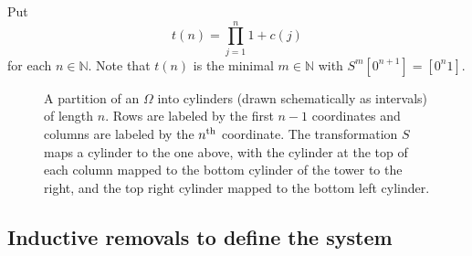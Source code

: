 \documentclass[10pt]{amsart}
\theoremstyle{definition}\newtheorem{defi}[theo]{Definition}\newtheorem{rema}[theo]{Remark}\newtheorem{exam}[theo]{Example}\newtheorem{exem}[theo]{Example}\newtheorem{nota}[theo]{Notation}
\newcommand{\N}{\mathbb{N}}
\begin{document}
Put
\[
t(n) = \prod_{j=1}^n 1 + c(j)
\]
for each $n \in \N$. Note that $t(n)$ is the minimal $m \in \N$ with $S^m[0^{n+1}]=[0^n 1]$.



\begin{figure}[!h]
\centering
{}

\caption{A partition of an $\Omega$ into cylinders (drawn schematically as intervals) of length $n$. Rows are labeled by the first $n - 1$ coordinates and columns are labeled by the $n^{\rm th}$ coordinate. The transformation $S$ maps a cylinder to the one above, with the cylinder at the top of each column mapped to the bottom cylinder of the tower to the right, and the top right cylinder mapped to the bottom left cylinder.}\label{fig:odometerTower}
\end{figure}


\subsection{Inductive removals to define the system}\label{subsec:removals}
\end{document}
